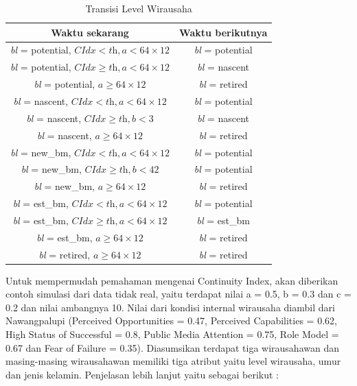 \begin{table}[H]
\centering
\caption{Transisi Level Wirausaha}
\begin{tabular}{|c|c|}
\hline
Waktu sekarang & Waktu berikutnya \\
\hline
\textit{bl} = potential, $ \textit{CIdx} < \textit{th}, \textit{a} < 64 \times 12$ & \textit{bl} = potential \\
\hline
\textit{bl} = potential, $\textit{CIdx} \geq \textit{th}, \textit{a} < 64 \times 12$ & \textit{bl} = nascent \\
\hline
\textit{bl} = potential, $\textit{a} \geq 64 \times 12$ & \textit{bl} = retired \\
\hline
\textit{bl} = nascent, $\textit{CIdx} < \textit{th}, \textit{a} <64 \times 12$ & \textit{bl} = potential \\
\hline
\textit{bl} = nascent, $\textit{CIdx} \geq \textit{th}, \textit{b} < 3$ & \textit{bl} = nascent \\
\hline
\textit{bl} = nascent, $\textit{a} \geq 64 \times 12$ & \textit{bl} = retired \\
\hline
\textit{bl} = new\_bm, $\textit{CIdx} < \textit{th}, \textit{a} < 64 \times 12$ & \textit{bl} = potential \\
\hline
\textit{bl} = new\_bm, $\textit{CIdx} \geq \textit{th}, \textit{b} < 42$ & \textit{bl} = potential \\
\hline
\textit{bl} = new\_bm, $\textit{a} \geq 64 \times 12$ & \textit{bl} = retired \\
\hline
\textit{bl} = est\_bm, $\textit{CIdx} < \textit{th}, \textit{a} < 64 \times 12$ & \textit{bl} = potential \\
\hline
\textit{bl} = est\_bm, $\textit{CIdx} \geq \textit{th}, \textit{a} < 64 \times 12$ & \textit{bl} = est\_bm \\
\hline
\textit{bl} = est\_bm, $\textit{a} \geq 64 \times 12$ & \textit{bl} = retired \\
\hline
\textit{bl} = retired, $\textit{a} \geq 64 \times 12$ & \textit{bl} = retired \\
\hline
\end{tabular}
\label{tabelLW}
\end{table}


Untuk mempermudah pemahaman mengenai Continuity Index, akan diberikan contoh simulasi dari data tidak real, yaitu terdapat nilai a = 0.5, b = 0.3 dan c = 0.2 dan nilai ambangnya 10. Nilai dari kondisi internal wirausaha diambil dari Nawangpalupi (Perceived Opportunities = 0.47, Perceived Capabilities = 0.62, High Status of Successful = 0.8, Public Media Attention = 0.75, Role Model = 0.67 dan Fear of Failure = 0.35). Diasumsikan terdapat tiga wirausahawan dan masing-masing wirausahawan memiliki tiga atribut yaitu level wirausaha, umur dan jenis kelamin. Penjelasan lebih lanjut yaitu sebagai berikut :
				
